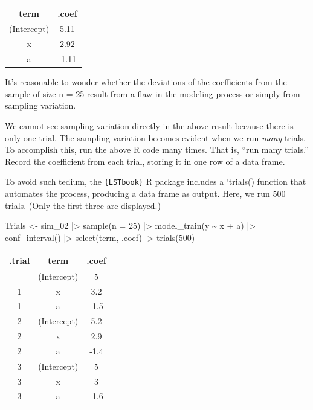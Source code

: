\documentclass[
  letterpaper,
  DIV=11,
  numbers=noendperiod,
  oneside]{scrartcl}
\newenvironment{Shaded}{\begin{snugshade}}{\end{snugshade}}
\newcommand{\AttributeTok}[1]{\textcolor[rgb]{0.40,0.45,0.13}{#1}}
\newcommand{\DecValTok}[1]{\textcolor[rgb]{0.68,0.00,0.00}{#1}}
\newcommand{\FunctionTok}[1]{\textcolor[rgb]{0.28,0.35,0.67}{#1}}
\newcommand{\NormalTok}[1]{\textcolor[rgb]{0.00,0.23,0.31}{#1}}
\newcommand{\OtherTok}[1]{\textcolor[rgb]{0.00,0.23,0.31}{#1}}
\newcommand{\SpecialCharTok}[1]{\textcolor[rgb]{0.37,0.37,0.37}{#1}}
\begin{document}
\begin{longtable}[]{@{}cc@{}}
\toprule\noalign{}
term & .coef \\
\midrule\noalign{}
\endhead
\bottomrule\noalign{}
\endlastfoot
(Intercept) & 5.11 \\
x & 2.92 \\
a & -1.11 \\
\end{longtable}

It's reasonable to wonder whether the deviations of the coefficients
from the sample of size n = 25 result from a flaw in the modeling
process or simply from sampling variation.

We cannot see sampling variation directly in the above result because
there is only one trial. The sampling variation becomes evident when we
run \emph{many} trials. To accomplish this, run the above R code many
times. That is, ``run many trials.'' Record the coefficient from each
trial, storing it in one row of a data frame.

To avoid such tedium, the \texttt{\{LSTbook\}} R package includes a
`trials() function that automates the process, producing a data frame as
output. Here, we run 500 trials. (Only the first three are displayed.)

\begin{Shaded}
\begin{Highlighting}[]
\NormalTok{Trials }\OtherTok{\textless{}{-}} 
\NormalTok{  sim\_02 }\SpecialCharTok{|\textgreater{}} \FunctionTok{sample}\NormalTok{(}\AttributeTok{n =} \DecValTok{25}\NormalTok{) }\SpecialCharTok{|\textgreater{}} 
  \FunctionTok{model\_train}\NormalTok{(y }\SpecialCharTok{\textasciitilde{}}\NormalTok{ x }\SpecialCharTok{+}\NormalTok{ a) }\SpecialCharTok{|\textgreater{}}
  \FunctionTok{conf\_interval}\NormalTok{() }\SpecialCharTok{|\textgreater{}}
  \FunctionTok{select}\NormalTok{(term, .coef) }\SpecialCharTok{|\textgreater{}}
  \FunctionTok{trials}\NormalTok{(}\DecValTok{500}\NormalTok{)}
\end{Highlighting}
\end{Shaded}

\begin{longtable}[]{@{}ccc@{}}
\toprule\noalign{}
.trial & term & .coef \\
\midrule\noalign{}
\endhead
\bottomrule\noalign{}
\endlastfoot
1 & (Intercept) & 5 \\
1 & x & 3.2 \\
1 & a & -1.5 \\
2 & (Intercept) & 5.2 \\
2 & x & 2.9 \\
2 & a & -1.4 \\
3 & (Intercept) & 5 \\
3 & x & 3 \\
3 & a & -1.6 \\
\end{longtable}
\end{document}
